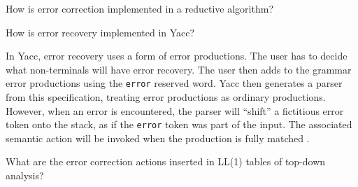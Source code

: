 \begin{Exercise}
How is error correction implemented in a reductive algorithm?
\end{Exercise}

\begin{Exercise}[difficulty=1]
How is error recovery implemented in Yacc?
\end{Exercise}
\begin{Answer}
In Yacc, error recovery uses a form of error productions.
The user has to decide what non-terminals will have error recovery.
The user then adds to the grammar error productions using the \texttt{error} reserved word.
Yacc then generates a parser from this specification, treating error productions as ordinary productions.
However, when an error is encountered, the parser will ``shift'' a fictitious error token onto the stack, as if the \texttt{error} token was part of the input.
The associated semantic action will be invoked when the production is fully matched \cite[p.~295]{compilers-aho-2007}.
\end{Answer}

\begin{Exercise}
What are the error correction actions inserted in LL(1) tables of top-down analysis?
\end{Exercise}

